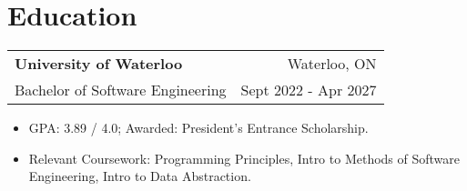 \documentclass[letterpaper,10.8pt]{article}
\makeatletter
\newcommand{\resumeSubheading}[4]{
  \vspace{-1pt}\item
    \begin{tabular*}{0.97\textwidth}{l@{\extracolsep{\fill}}r}
      \textbf{#1} & #2 \\
    \small#3 & \small #4 \\
    \end{tabular*}\vspace{-5pt}
}
\makeatother
\begin{document}
\section{Education}

    \resumeSubheading
		{University of Waterloo}{Waterloo, ON}
      {Bachelor of Software Engineering}{Sept 2022 - Apr 2027}
		\vspace{2mm}
    \begin{itemize} [noitemsep,nolistsep]
        \item GPA: 3.89 / 4.0; Awarded: President's Entrance Scholarship.
        \item Relevant Coursework: Programming Principles, Intro to Methods of Software Engineering, Intro to Data Abstraction.
    \end{itemize}


\end{document}
